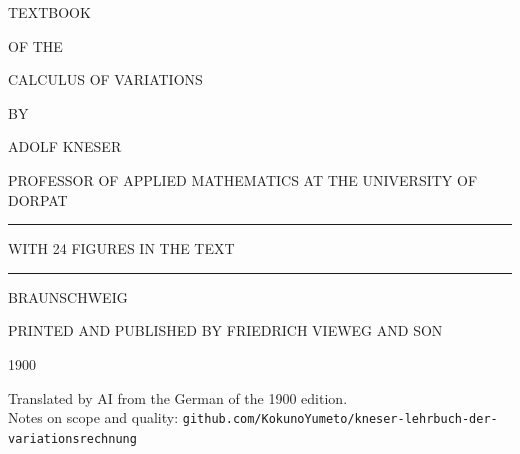 \documentclass[11pt,a4paper,leqno]{article}
\begin{document}
\begin{titlepage}
\centering
\vspace*{20mm}
{\Huge TEXTBOOK}\par\vspace{7mm}
{\small OF THE}\par\vspace{7mm}
{\Huge CALCULUS OF VARIATIONS}\par\vspace{12mm}
{\small BY}\par\vspace{9mm}
{\LARGE ADOLF KNESER}\par\vspace{2mm}
{\scriptsize PROFESSOR OF APPLIED MATHEMATICS AT THE UNIVERSITY OF DORPAT}\par
\vspace{8mm}\rule{30mm}{0.4pt}\par\vspace{22mm}
{\footnotesize WITH 24 FIGURES IN THE TEXT}\par
\vspace{30mm}
\rule{0.85\linewidth}{0.8pt}\par\vspace{5mm}
{\large BRAUNSCHWEIG}\par\vspace{2mm}
{\footnotesize PRINTED AND PUBLISHED BY FRIEDRICH VIEWEG AND SON}\par\vspace{2mm}
{\large 1900}\par
\vfill
{\footnotesize Translated by AI from the German of the 1900 edition.\\
Notes on scope and quality: \texttt{github.com/KokunoYumeto/kneser-lehrbuch-der-variationsrechnung}}\par
\end{titlepage}


\end{document}
